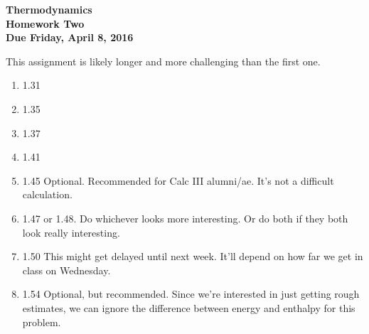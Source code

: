 \documentclass[12pt]{article}
\begin{document}
\pagestyle{empty}
 
\begin{center}
{\large {\bf Thermodynamics}}\\
\medskip
{\large {\bf Homework Two}}\\
\medskip
{ {\bf Due Friday, April 8, 2016}}\\
\end{center}

\medskip

\indent This assignment is likely longer and more challenging than the
first one.  

\begin{enumerate}
\setlength{\itemsep}{1mm}
  \item 1.31
  \item 1.35
  \item 1.37
  \item 1.41
  \item 1.45 Optional.  Recommended for Calc III
    alumni/ae. It's not a difficult calculation.
  \item 1.47 or 1.48. Do whichever looks more interesting. Or do both
    if they both look really interesting.
  \item 1.50 This might get delayed until next week.  It'll depend on
    how far we get in class on Wednesday.
  \item 1.54 Optional, but recommended.  Since we're interested in
    just getting rough estimates, we can ignore the difference between
    energy and enthalpy for this problem. 
\end{enumerate}

\end{document}
